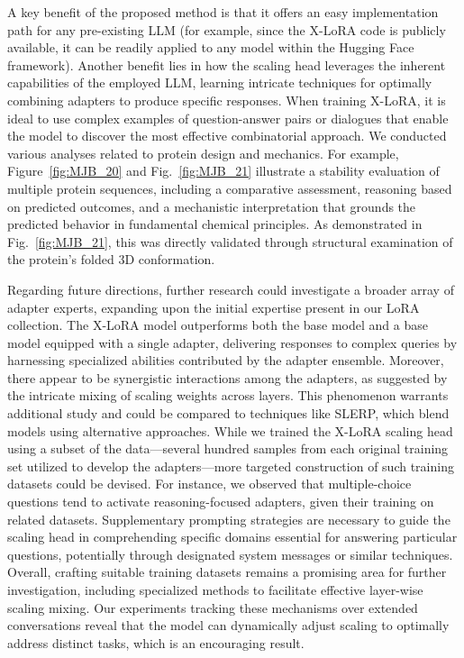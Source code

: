 A key benefit of the proposed method is that it offers an easy implementation path for any pre-existing LLM (for example, since the X-LoRA code is publicly available, it can be readily applied to any model within the Hugging Face framework). Another benefit lies in how the scaling head leverages the inherent capabilities of the employed LLM, learning intricate techniques for optimally combining adapters to produce specific responses. When training X-LoRA, it is ideal to use complex examples of question-answer pairs or dialogues that enable the model to discover the most effective combinatorial approach. We conducted various analyses related to protein design and mechanics. For example, Figure~\ref{fig:MJB_20} and Fig.~\ref{fig:MJB_21} illustrate a stability evaluation of multiple protein sequences, including a comparative assessment, reasoning based on predicted outcomes, and a mechanistic interpretation that grounds the predicted behavior in fundamental chemical principles. As demonstrated in Fig.~\ref{fig:MJB_21}, this was directly validated through structural examination of the protein’s folded 3D conformation.

Regarding future directions, further research could investigate a broader array of adapter experts, expanding upon the initial expertise present in our LoRA collection. The X-LoRA model outperforms both the base model and a base model equipped with a single adapter, delivering responses to complex queries by harnessing specialized abilities contributed by the adapter ensemble. Moreover, there appear to be synergistic interactions among the adapters, as suggested by the intricate mixing of scaling weights across layers. This phenomenon warrants additional study and could be compared to techniques like SLERP, which blend models using alternative approaches. While we trained the X-LoRA scaling head using a subset of the data—several hundred samples from each original training set utilized to develop the adapters—more targeted construction of such training datasets could be devised. For instance, we observed that multiple-choice questions tend to activate reasoning-focused adapters, given their training on related datasets. Supplementary prompting strategies are necessary to guide the scaling head in comprehending specific domains essential for answering particular questions, potentially through designated system messages or similar techniques. Overall, crafting suitable training datasets remains a promising area for further investigation, including specialized methods to facilitate effective layer-wise scaling mixing. Our experiments tracking these mechanisms over extended conversations reveal that the model can dynamically adjust scaling to optimally address distinct tasks, which is an encouraging result.

